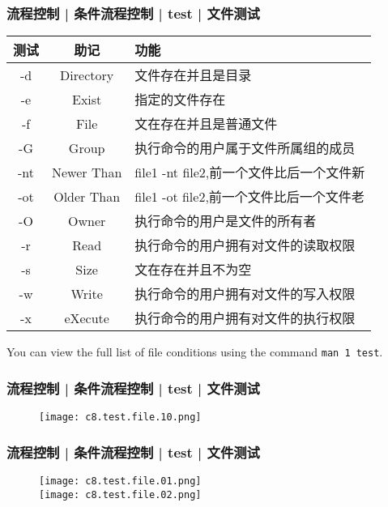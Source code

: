 \begin{frame}[fragile]
  \frametitle{流程控制 | 条件流程控制 | test | \alert{文件测试}}
  \begin{table}
    \centering
    \begin{tabularx}{\textwidth}{ccX}
      \hline
      \rowcolor{blue!50}测试 & 助记 & 功能\\
      \hline
      -d & Directory & 文件存在并且是目录\\
      -e & Exist & 指定的文件存在\\
      -f & File & 文在存在并且是普通文件\\
      -G & Group & 执行命令的用户属于文件所属组的成员\\
      -nt & Newer Than & file1 -nt file2,前一个文件比后一个文件新\\
      -ot & Older Than & file1 -ot file2,前一个文件比后一个文件老\\
      -O & Owner & 执行命令的用户是文件的所有者\\
      -r & Read & 执行命令的用户拥有对文件的读取权限\\
      -s & Size & 文在存在并且不为空\\
      -w & Write & 执行命令的用户拥有对文件的写入权限\\
      -x & eXecute & 执行命令的用户拥有对文件的执行权限\\
      \hline
    \end{tabularx}
  \end{table}
  You can view the full list of file conditions using the command \verb|man 1 test|.
\end{frame}

\begin{frame}
  \frametitle{流程控制 | 条件流程控制 | test | 文件测试}
  \begin{figure}
    \centering
    \texttt{[image: c8.test.file.10.png]}
  \end{figure}
\end{frame}

\begin{frame}
  \frametitle{流程控制 | 条件流程控制 | test | 文件测试}
  \begin{figure}
    \centering
    \texttt{[image: c8.test.file.01.png]}\\
    \texttt{[image: c8.test.file.02.png]}
  \end{figure}
\end{frame}


